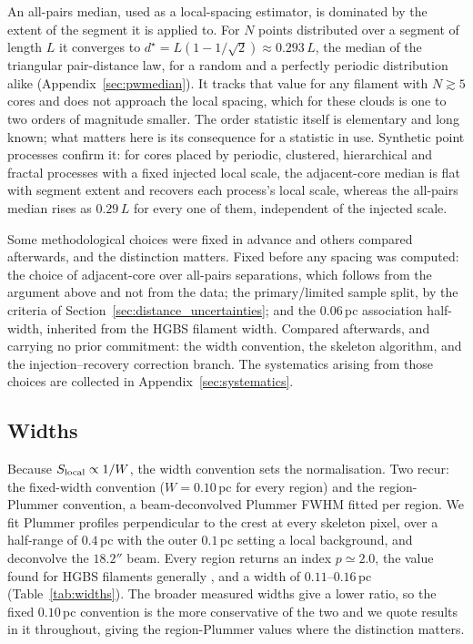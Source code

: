 \documentclass[usenatbib,twoside,twocolumn]{mnras}
\begin{document}
An all-pairs median, used as a local-spacing estimator, is dominated by the extent of the segment it is applied to. For $N$ points distributed over a segment of length $L$ it converges to $d^\star=L(1-1/\sqrt{2})\approx0.293\,L$, the median of the triangular pair-distance law, for a random and a perfectly periodic distribution alike (Appendix~\ref{sec:pwmedian}). It tracks that value for any filament with $N\gtrsim5$ cores and does not approach the local spacing, which for these clouds is one to two orders of magnitude smaller. The order statistic itself is elementary and long known; what matters here is its consequence for a statistic in use. Synthetic point processes confirm it: for cores placed by periodic, clustered, hierarchical and fractal processes with a fixed injected local scale, the adjacent-core median is flat with segment extent and recovers each process's local scale, whereas the all-pairs median rises as $0.29\,L$ for every one of them, independent of the injected scale.

Some methodological choices were fixed in advance and others compared afterwards, and the distinction matters. Fixed before any spacing was computed: the choice of adjacent-core over all-pairs separations, which follows from the argument above and not from the data; the primary/limited sample split, by the criteria of Section~\ref{sec:distance_uncertainties}; and the $0.06$\,pc association half-width, inherited from the HGBS filament width. Compared afterwards, and carrying no prior commitment: the width convention, the skeleton algorithm, and the injection--recovery correction branch. The systematics arising from those choices are collected in Appendix~\ref{sec:systematics}.

\subsection{Widths}
\label{sec:width}

Because $S_{\rm local}\propto1/W$, the width convention sets the normalisation. Two recur: the fixed-width convention ($W=0.10$\,pc for every region) and the region-Plummer convention, a beam-deconvolved Plummer FWHM fitted per region. We fit Plummer profiles perpendicular to the crest at every skeleton pixel, over a half-range of $0.4$\,pc with the outer $0.1$\,pc setting a local background, and deconvolve the $18.2''$ beam. Every region returns an index $p\simeq2.0$, the value found for HGBS filaments generally \citep{Arzoumanian2019}, and a width of $0.11$--$0.16$\,pc (Table~\ref{tab:widths}). The broader measured widths give a lower ratio, so the fixed $0.10$\,pc convention is the more conservative of the two and we quote results in it throughout, giving the region-Plummer values where the distinction matters.
\end{document}
